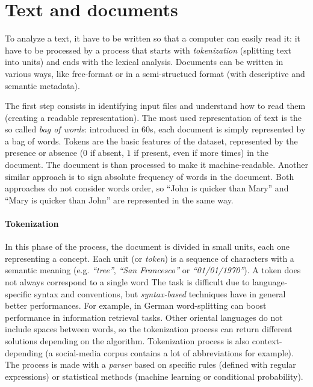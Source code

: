 \documentclass[11pt, a4page]{article}
\begin{document}
\section{Text and documents}
To analyze a text, it have to be written so that a computer can easily read it: it have to be processed by a process that starts with \textit{tokenization} (splitting text into units) and ends with the lexical analysis.
Documents can be written in various ways, like free-format or in a semi-structued format (with descriptive and semantic metadata).

The first step consists in identifying input files and understand how to read them (creating a readable representation).
The most used representation of text is the so called \textit{bag of words}: introduced in 60s, each document is simply represented by a bag of words.
Tokens are the basic features of the dataset, represented by the presence or absence ($0$ if absent, $1$ if present, even if more times) in the document.
The document is than processed to make it machine-readable.
Another similar approach is to sign absolute frequency of words in the document.
Both approaches do not consider words order, so ``John is quicker than Mary'' and ``Mary is quicker than John'' are represented in the same way.

\paragraph{Tokenization}
In this phase of the process, the document is divided in small units, each one representing a concept.
Each unit (or \textit{token}) is a sequence of characters with a semantic meaning (e.g. \textit{``tree''}, \textit{``San Francesco''} or \textit{``01/01/1970''}).
A token does not always correspond to a single word
The task is difficult due to language-specific syntax and conventions, but \textit{syntax-based} techniques have in general better performances.
For example, in German word-splitting can boost performance in information retrieval tasks.
Other oriental languages do not include spaces between words, so the tokenization process can return different solutions depending on the algorithm.
Tokenization process is also context-depending (a social-media corpus contains a lot of abbreviations for example). \newline
The process is made with a \textit{parser} based on specific rules (defined with regular expressions) or statistical methods (machine learning or conditional probability).
\end{document}
